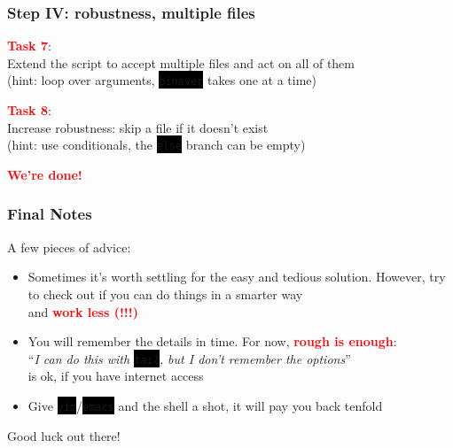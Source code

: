 \documentclass[unknownkeysallowed, 10pt, a4 paper, handout]{beamer}
\newcommand{\focus}[1]{\textbf{\textcolor{red}{#1}}}
\newcommand{\code}[1]{\colorbox{black}{\color{green}\texttt{#1}}}
\begin{document}
\begin{frame}
	\begin{center}
		\frametitle{Step IV: robustness, multiple files}

		\focus{Task 7}:\\
		Extend the script to accept multiple files and act on all of them\\
		(hint: loop over arguments, \code{binaver} takes one at a time)

		\vspace{8mm}

		\focus{Task 8}:\\
		Increase robustness: skip a file if it doesn't exist\\
		(hint: use conditionals, the \code{else} branch can be empty)

		\vspace{8mm}

    \focus{We're done!}
	\end{center}
\end{frame}


\begin{frame}
	\begin{center}
		\frametitle{Final Notes}

    A few pieces of advice:

    \vspace{6mm}

    \begin{itemize}
      \item Sometimes it's worth settling for the easy and tedious solution.
        However, try to check out if you can do things in a smarter way\\
        and \focus{work less (!!!)}

      \vspace{4mm}

      \item You will remember the details in time. For now, \focus{rough is enough}:\\
        ``\textit{I can do this with \code{tail}, but I don't remember the options}''\\
        is ok, if you have internet access

      \vspace{4mm}

      \item Give \code{vim}/\code{emacs} and the shell a shot, it will pay you
        back tenfold
    \end{itemize}

    \vspace{6mm}

    Good luck out there!
	\end{center}
\end{frame}
\end{document}
